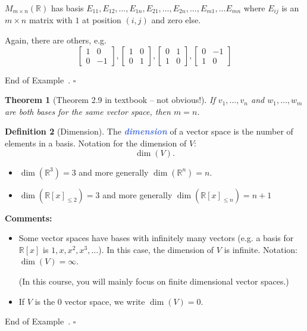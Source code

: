 \documentclass[10pt]{article}
\newcommand{\demph}[1]{\textcolor{RoyalBlue}{\textbf{\slshape #1}}} %
\newtheorem{theorem}{Theorem}
\theoremstyle{definition}
\newtheorem{definition}[theorem]{Definition}
\newtheorem{example}[theorem]{Example}
\renewenvironment{example}
{\begin{oldexample}}
  {\par\smallskip\hfill   End of Example~\theexample. $\square$    \par\end{oldexample}}
\newcommand{\R}{\mathbb{R}}           %
\begin{document}
\begin{example}
  $M_{m\times n}(\R)$ has basis $E_{11},E_{12},\ldots,E_{1n},E_{21}, \ldots,
  E_{2n},\ldots, E_{m1},\ldots E_{mn}$
  where $E_{ij}$ is an $m\times n$ matrix with $1$ at position $(i,j)$ and
  zero else.

  Again, there are others, e.g.
  \begin{equation*}
    \begin{bmatrix}
      1&0\\
      0&-1
    \end{bmatrix},
    \begin{bmatrix}
      1&0\\
      0&1
    \end{bmatrix},
    \begin{bmatrix}
      0&1\\
      1&0
    \end{bmatrix},
    \begin{bmatrix}
      0&-1\\
      1&0
    \end{bmatrix}
  \end{equation*}
\end{example}

\begin{theorem}[Theorem 2.9 in textbook -- not obvious!]
  If $v_{1},\ldots,v_{n}$ and $w_{1},\ldots,w_{m}$ are both bases for the same
  vector space, then $m=n$.
\end{theorem}

\begin{definition}[Dimension]
  \label{def:dimension}
  The \demph{dimension} of a vector space is the number of elements in a
  basis. Notation for the dimension of $V$:
  \begin{equation*}
    \dim(V).
  \end{equation*}
\end{definition}

\begin{example}[Dimension]
  \label{ex:dimension}
  \begin{itemize}
    \item $\dim(\R^{3})=3$ and more generally $\dim(\R^{n})=n$. 
    \item $\dim( \R[x]_{ \leq 2})=3$ and more generally $\dim(\R[x]_{ \leq n})=n+1$
  \end{itemize}
  \textbf{Comments:}
  \begin{itemize}
    \item Some vector spaces have bases with infinitely many vectors (e.g. a
    basis for $\R[x]$ is $1,x,x^{2},x^{3},\ldots$). In this case, the
    dimension of $V$ is infinite. Notation: $\dim(V)=\infty$.

    (In this course, you will mainly focus on finite dimensional vector
    spaces.)
    \item If $V$ is the $0$ vector space, we write $\dim(V)=0$.
  \end{itemize}
\end{example}
\end{document}
